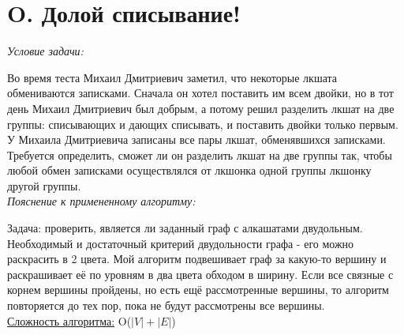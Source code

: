 \section{O. Долой списывание!}
\textit{Условие задачи:} \par
Во время теста Михаил Дмитриевич заметил, что некоторые лкшата обмениваются записками. Сначала он хотел поставить им всем двойки, но в тот день Михаил
Дмитриевич был добрым, а потому решил разделить лкшат на две группы: списывающих и дающих списывать, и поставить двойки только первым.\\
У Михаила Дмитриевича записаны все пары лкшат, обменявшихся записками. Требуется определить, сможет ли он разделить лкшат на две группы так, чтобы любой
обмен записками осуществлялся от лкшонка одной группы лкшонку другой группы.\\
\textit{Пояснение к примененному алгоритму:} \par
Задача: проверить, является ли заданный граф с алкашатами двудольным. Необходимый и достаточный критерий двудольности графа - его можно раскрасить в 2 цвета.
Мой алгоритм подвешивает граф за какую-то вершину и раскрашивает её по уровням в два цвета обходом в ширину. Если все связные с корнем вершины пройдены, но
есть ещё рассмотренные вершины, то алгоритм повторяется до тех пор, пока не будут рассмотрены все вершины.\\
\underline{Сложность алгоритма:} O($|V| + |E|$)\\

